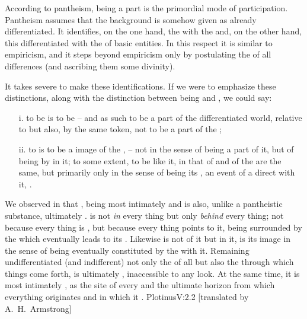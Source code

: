 \pa
According to pantheism, being a part is the primordial mode of participation.
Pantheism assumes that the background is somehow given as already
differentiated. It identifies, on the one hand, the 
with the  and, on the other hand, this 
differentiated with the  of basic entities. In this respect it is
similar to empiricism, and it steps beyond empiricism only by postulating the
 of all differences (and ascribing them some divinity).

It takes severe  to make these identifications. 
If we were to emphasize these distinctions, along with the distinction between
being and , we could say:
\begin{itemize}\MyLPar
\item[i.] to be is to be  -- and as such to be a part of the
differentiated world, relative to  but also, by the same token,
not to be a part of the ;
\item[ii.]
to  is to be a
 image of the ,  -- not in the sense
of being a part of it, but of being  by  in it; to
some extent, to be like it, in that  of  and
 of the  are the same, but primarily  only in the sense of
being its , an event of a direct 
with it, .
\end{itemize}

\pa\label{immanentTranscendent}
We observed in  that
, being most intimately  and  is also, unlike a
pantheistic substance, ultimately . 
 is  not {\em in} every thing but only {\em behind} every
thing; not because every thing is , but because every thing points
to it, being surrounded by the  which eventually leads to its
. Likewise  is not  of it but
 in it, is its image in the sense of being eventually
constituted by the  with it.  Remaining undifferentiated (and
indifferent)  not only the  of all  but
also the  through which things come forth,  is ultimately
, inaccessible to any  look. At the same time, it is
most intimately , as the site of every  and
the ultimate horizon from which everything originates and in which it
. \citet{All these things are the One and not the One: they are
  He because they come from Him; they are not He, because it is in abiding by
  Himself that he gives them.}{Plotinus}{V:2.2 [translated by A.~H.~Armstrong]}

